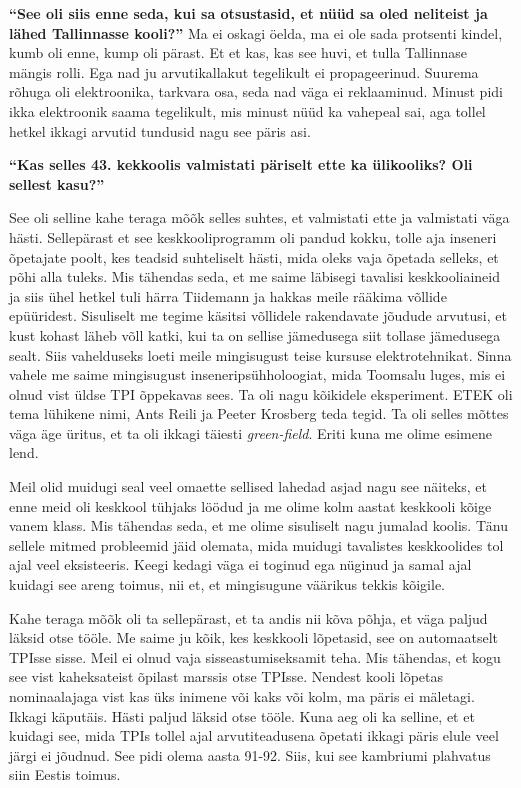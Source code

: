 \textbf{\enquote{See oli siis enne seda, kui sa otsustasid, et nüüd sa oled neliteist ja lähed Tallinnasse kooli?}}
Ma ei oskagi öelda, ma ei ole sada protsenti kindel, kumb oli enne, kump oli pärast. Et et kas, kas see huvi, et tulla Tallinnase mängis rolli. Ega nad ju arvutikallakut tegelikult ei propageerinud.  Suurema rõhuga oli  elektroonika, tarkvara osa, seda nad väga ei reklaaminud. Minust pidi ikka elektroonik saama tegelikult, mis minust nüüd ka vahepeal sai, aga tollel hetkel ikkagi arvutid tundusid nagu see päris asi. 

\textbf{\enquote{Kas selles 43. kekkoolis valmistati päriselt ette ka ülikooliks? Oli sellest kasu?}}

See oli selline kahe teraga mõõk selles suhtes, et valmistati ette ja valmistati väga hästi. Sellepärast et see keskkooliprogramm oli pandud kokku, tolle aja inseneri õpetajate poolt, kes teadsid suhteliselt hästi, mida oleks vaja õpetada selleks, et põhi alla tuleks. Mis tähendas seda, et me saime läbisegi  tavalisi keskkooliaineid ja siis ühel hetkel tuli härra Tiidemann ja hakkas meile rääkima võllide epüüridest. Sisuliselt me tegime käsitsi võllidele rakendavate jõudude arvutusi, et kust kohast läheb võll katki, kui ta on sellise jämedusega siit tollase jämedusega sealt. Siis vahelduseks loeti meile mingisugust teise kursuse elektrotehnikat. Sinna vahele me saime mingisugust inseneripsühholoogiat, mida Toomsalu luges, mis ei olnud vist üldse TPI õppekavas sees. Ta oli nagu kõikidele eksperiment. ETEK  oli tema lühikene nimi, Ants Reili ja Peeter Krosberg teda tegid. Ta oli selles mõttes väga äge üritus, et ta oli ikkagi täiesti \emph{green-field}. Eriti kuna me olime esimene lend. 

Meil olid muidugi seal veel omaette sellised lahedad asjad nagu see näiteks, et enne meid oli keskkool tühjaks löödud ja me olime kolm aastat keskkooli kõige vanem klass. Mis tähendas seda, et me olime sisuliselt nagu jumalad koolis. Tänu sellele mitmed probleemid jäid olemata, mida muidugi tavalistes keskkoolides tol ajal veel eksisteeris. Keegi kedagi väga ei toginud ega nüginud ja samal ajal kuidagi see areng toimus, nii et, et mingisugune väärikus tekkis kõigile. 

Kahe teraga mõõk oli ta sellepärast, et ta andis nii kõva põhja, et väga paljud läksid otse tööle. Me saime ju kõik, kes keskkooli lõpetasid, see on automaatselt TPIsse sisse. Meil ei olnud vaja sisseastumiseksamit teha. Mis tähendas, et kogu see vist kaheksateist õpilast marssis otse TPIsse. Nendest kooli lõpetas nominaalajaga vist  kas üks inimene või kaks või kolm, ma päris ei mäletagi. Ikkagi käputäis. Hästi paljud läksid otse tööle. Kuna aeg oli ka selline, et et kuidagi see, mida TPIs tollel ajal arvutiteadusena õpetati ikkagi päris elule veel järgi ei jõudnud. See pidi olema aasta 91-92. Siis, kui see kambriumi plahvatus siin Eestis toimus.


